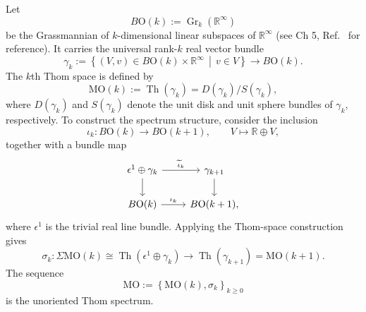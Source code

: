 \documentclass[aps,prx,reprint,superscriptaddress,twocolumn,amsmath,amssymb,amsfonts, nofootinbib]{revtex4-2}
\theoremstyle{apsstyle}
\begin{document}
\noindent Let
\begin{equation*}
    B\mathrm{O}(k)
    :=
    \operatorname{Gr}_{k}(\mathbb{R}^{\infty})
\end{equation*}
be the Grassmannian of $k$-dimensional linear subspaces of $\mathbb{R}^{\infty}$ (see Ch 5, Ref.~\cite{Milnor} for reference). It carries the universal rank-$k$ real vector bundle
\begin{equation*}
    \gamma_{k}
    :=
    \left\{
        (V,v)\in B\mathrm{O}(k)\times\mathbb{R}^{\infty}
        \,\middle|\,
        v\in V
    \right\}
    \longrightarrow
    B\mathrm{O}(k).
\end{equation*}
The $k$th Thom space is defined by
\begin{equation}
    \mathrm{MO}(k)
    :=
    \operatorname{Th}(\gamma_{k})
    =
    D(\gamma_{k})/S(\gamma_{k}),
    \label{eq:MO_k_Thom_space}
\end{equation}
where $D(\gamma_k)$ and $S(\gamma_k)$ denote the unit disk and unit sphere bundles of $\gamma_k$, respectively. To construct the spectrum structure, consider the inclusion
\begin{equation*}
    \iota_{k}:
    B\mathrm{O}(k)\longrightarrow B\mathrm{O}(k+1),
    \qquad
    V\longmapsto\mathbb{R}\oplus V,
\end{equation*}
together with a bundle map
\begin{equation*}
\begin{tikzcd}
\epsilon^{1}\oplus\gamma_{k}
    \arrow[r,"\widetilde{\iota}_{k}"]
    \arrow[d]
&
\gamma_{k+1}
    \arrow[d]
\\
B\mathrm{O}(k)
    \arrow[r,"\iota_{k}"]
&
B\mathrm{O}(k+1),
\end{tikzcd}
\end{equation*}
where $\epsilon^{1}$ is the trivial real line bundle. Applying the Thom-space
construction gives
\begin{equation}
    \sigma_{k}:
    \Sigma\mathrm{MO}(k)
    \cong
    \operatorname{Th}(\epsilon^{1}\oplus\gamma_{k})
    \longrightarrow
    \operatorname{Th}(\gamma_{k+1})
    =
    \mathrm{MO}(k+1).
    \label{eq:MO_spectrum_structure_map}
\end{equation}
The sequence
\begin{equation*}
    \mathrm{MO}
    :=
    \left\{
        \mathrm{MO}(k),\sigma_{k}
    \right\}_{k\geq0}
\end{equation*}
is the unoriented Thom spectrum.

\bigskip 
\end{document}
